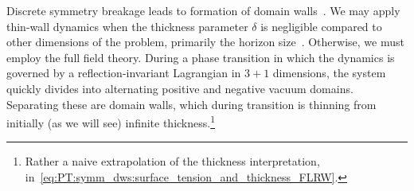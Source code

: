 



\newcommand{\lcoord}{\ALIASlcoord} %
\newcommand{\lcoordx}{\ALIASlcoordx} %
\newcommand{\lcoordk}{\ALIASlcoordk} %
\newcommand*\Ft{\ALIASFt}
\newcommand\dummy{\ALIASdummy}
\newcommand*\Tw{\ALIASTw}
\newcommand*\Twf{\ALIASTwf}












Discrete symmetry breakage leads to formation of domain walls~\citep{vilenkinCosmicStringsOther1994}. %
We may apply thin-wall dynamics when the thickness parameter $\delta$ is negligible compared to other dimensions of the problem, primarily the horizon size~\citep{vilenkinCosmicStringsOther1994}. Otherwise, we must employ the full field theory. %
During a phase transition in which the dynamics is governed by a reflection-invariant Lagrangian in $3+1$ dimensions, the system quickly divides into alternating positive and negative vacuum domains. %
Separating these are domain walls, which during transition is thinning from initially (as we will see) infinite thickness.\footnote{Rather a naive extrapolation of the thickness interpretation, in~\cref{eq:PT:symm_dws:surface_tension_and_thickness_FLRW}.}  



